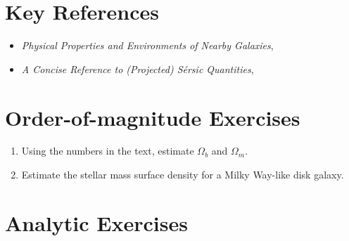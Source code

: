 \section{Key References}

\begin{itemize}
\item {\it Physical Properties and Environments of Nearby
Galaxies}, \citet{blanton09a}
\item {\it A Concise Reference to (Projected) S{\'e}rsic
Quantities}, \citet{Graham:2005p2523}
\end{itemize}

\section{Order-of-magnitude Exercises}

\begin{enumerate} 
\item Using the numbers in the text, estimate $\Omega_b$ and
    $\Omega_m$. 
\item Estimate the stellar mass surface density for a Milky Way-like
disk galaxy.
\end{enumerate} 

\section{Analytic Exercises}

